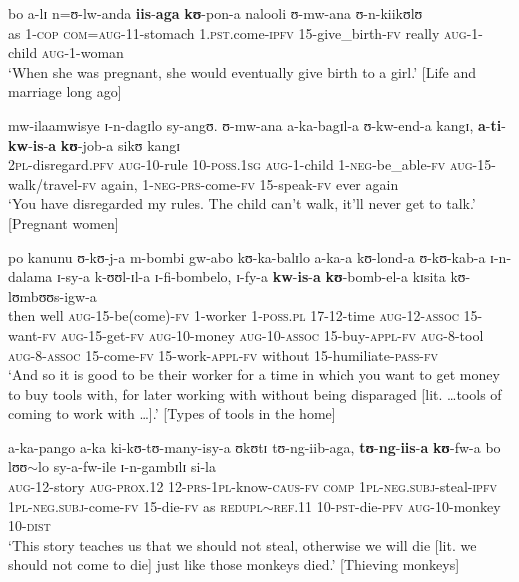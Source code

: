 \begin{exe}

\ex \gll bo a-lɪ n=ʊ-lw-anda \textbf{iis}-\textbf{aga} \textbf{kʊ}-pon-a nalooli ʊ-mw-ana ʊ-n-kiikʊlʊ\\
as 1-\textsc{cop} \textsc{com}=\textsc{aug}-11-stomach 1.\textsc{pst}.come-\textsc{ipfv} 15-give\_birth-\textsc{fv} really \textsc{aug}-1-child \textsc{aug}-1-woman\\
\glt \lq When she was pregnant, she would eventually give birth to a girl.' [Life and marriage long ago]

\ex \label{exIsaAuxNegPRS}\gll mw-ilaamwisye ɪ-n-dagɪlo sy-angʊ. ʊ-mw-ana a-ka-bagɪl-a ʊ-kw-end-a kangɪ, \textbf{a}-\textbf{ti}-\textbf{kw}-\textbf{is}-\textbf{a} \textbf{kʊ}-job-a sikʊ kangɪ\\
\textsc{2pl}-disregard.\textsc{pfv} \textsc{aug}-10-rule 10-\textsc{poss.1sg} \textsc{aug}-1-child 1-\textsc{neg}-be\_able-\textsc{fv} \textsc{aug}-15-walk/travel-\textsc{fv} again, 1-\textsc{neg}-\textsc{prs}-come-\textsc{fv} 15-speak-\textsc{fv} ever again\\
\glt `You have disregarded my rules. The child can't walk, it'll never get to talk.' [Pregnant women]

\ex \gll po kanunu ʊ-kʊ-j-a m-bombi gw-abo kʊ-ka-balɪlo a-ka-a kʊ-lond-a ʊ-kʊ-kab-a ɪ-n-dalama ɪ-sy-a k-ʊʊl-ɪl-a ɪ-fi-bombelo, ɪ-fy-a \textbf{kw}-\textbf{is}-\textbf{a} \textbf{kʊ}-bomb-el-a kɪsita kʊ-lʊmbʊʊs-igw-a\\
then well \textsc{aug}-15-be(come)-\textsc{fv} 1-worker 1-\textsc{poss.pl} 17-12-time \textsc{aug}-12-\textsc{assoc} 15-want-\textsc{fv} \textsc{aug}-15-get-\textsc{fv} \textsc{aug}-10-money \textsc{aug}-10-\textsc{assoc} 15-buy-\textsc{appl}-\textsc{fv} \textsc{aug}-8-tool \textsc{aug}-8-\textsc{assoc} 15-come-\textsc{fv} 15-work-\textsc{appl}-\textsc{fv} without 15-humiliate-\textsc{pass}-\textsc{fv}\\%
\glt \lq ‎‎And so it is good to be their worker for a time in which you want to get money to buy tools with, for later working with without being disparaged [lit. \ldots tools of coming to work with \ldots].' [Types of tools in the home]

\ex \gll a-ka-pango a-ka ki-kʊ-tʊ-many-isy-a ʊkʊtɪ tʊ-ng-iib-aga, \textbf{tʊ}-\textbf{ng}-\textbf{iis}-\textbf{a} \textbf{kʊ}-fw-a bo lʊʊ$\sim$lo sy-a-fw-ile ɪ-n-gambɪlɪ si-la\\
\textsc{aug}-12-story \textsc{aug}-\textsc{prox.12} 12-\textsc{prs}-\textsc{1pl}-know-\textsc{caus}-\textsc{fv} \textsc{comp} \textsc{1pl}-\textsc{neg.subj}-steal-\textsc{ipfv} \textsc{1pl}-\textsc{neg.subj}-come-\textsc{fv} 15-die-\textsc{fv} as \textsc{redupl}$\sim$\textsc{ref.11} 10-\textsc{pst}-die-\textsc{pfv} \textsc{aug}-10-monkey 10-\textsc{dist}\\
\glt `This story teaches us that we should not steal, otherwise we will die [lit. we should not come to die] just like those monkeys died.' [Thieving monkeys]
\end{exe}

